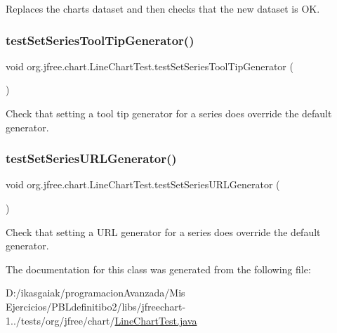 Replaces the chart\textquotesingle{}s dataset and then checks that the new dataset is OK. \mbox{\label{classorg_1_1jfree_1_1chart_1_1_line_chart_test_a5ee3e00b22ff88fe4b9a54a02cb1d424}} 
\subsubsection{\texorpdfstring{test\+Set\+Series\+Tool\+Tip\+Generator()}{testSetSeriesToolTipGenerator()}}
{\footnotesize\ttfamily void org.\+jfree.\+chart.\+Line\+Chart\+Test.\+test\+Set\+Series\+Tool\+Tip\+Generator (\begin{DoxyParamCaption}{ }\end{DoxyParamCaption})}

Check that setting a tool tip generator for a series does override the default generator. \mbox{\label{classorg_1_1jfree_1_1chart_1_1_line_chart_test_a48054073b6feecf7e0da43b6df30ef69}} 
\subsubsection{\texorpdfstring{test\+Set\+Series\+U\+R\+L\+Generator()}{testSetSeriesURLGenerator()}}
{\footnotesize\ttfamily void org.\+jfree.\+chart.\+Line\+Chart\+Test.\+test\+Set\+Series\+U\+R\+L\+Generator (\begin{DoxyParamCaption}{ }\end{DoxyParamCaption})}

Check that setting a U\+RL generator for a series does override the default generator. 

The documentation for this class was generated from the following file\+:\begin{DoxyCompactItemize}
\item 
D\+:/ikasgaiak/programacion\+Avanzada/\+Mis Ejercicios/\+P\+B\+Ldefinitibo2/libs/jfreechart-\/1../tests/org/jfree/chart/\mbox{\hyperlink{_line_chart_test_8java}{Line\+Chart\+Test.\+java}}\end{DoxyCompactItemize}
